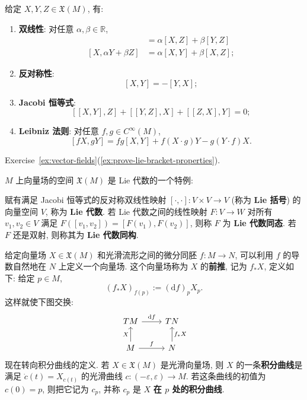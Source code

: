 \begin{RiemannProposition}\label{prop:identities-for-lie-bracket}
给定 $X,Y,Z\in\mathfrak{X}(M)$, 有:
\begin{enumerate}[label=(\roman*),leftmargin=*]
\item \textbf{双线性}: 对任意 $\alpha,\beta\in\mathbb{R}$,
\begin{align*}
  [\alpha X+\beta Y,Z]&=\alpha[X,Z]+\beta[Y,Z]\\
  [X,\alpha Y+\beta Z]&=\alpha[X,Y]+\beta[X,Z];
\end{align*}
\item \textbf{反对称性}:
\[
  [X,Y]=-[Y,X];
\]
\item \textbf{Jacobi 恒等式}:
\[
  [[X,Y],Z]+[[Y,Z],X]+[[Z,X],Y]=0;
\]
\item \textbf{Leibniz 法则}: 对任意 $f,g\in C^\infty(M)$,
\[
  [fX,gY]=fg[X,Y]+f(X\cdot g)Y-g(Y\cdot f)X.
\]
\end{enumerate}
\end{RiemannProposition}

\begin{RiemannProof}
Exercise~\ref{ex:vector-fields}(\ref{ex:prove-lie-bracket-properties}).
\end{RiemannProof}

$M$ 上向量场的空间 $\mathfrak{X}(M)$ 是 Lie 代数的一个特例:

\begin{RiemannDefinition}\label{def:lie-algebra}
赋有满足 Jacobi 恒等式的反对称双线性映射 $[\cdot,\cdot]:V\times V\to V$ (称为 \textbf{Lie 括号}) 的向量空间 $V$, 称为 \textbf{Lie 代数}. 若 Lie 代数之间的线性映射 $F:V\to W$ 对所有 $v_1,v_2\in V$ 满足 $F([v_1,v_2])=[F(v_1),F(v_2)]$, 则称 $F$ 为 \textbf{Lie 代数同态}. 若 $F$ 还是双射, 则称其为 \textbf{Lie 代数同构}.
\end{RiemannDefinition}

给定向量场 $X\in\mathfrak{X}(M)$ 和光滑流形之间的微分同胚 $f:M\to N$, 可以利用 $f$ 的导数自然地在 $N$ 上定义一个向量场. 这个向量场称为 $X$ 的\textbf{前推}, 记为 $f_*X$, 定义如下: 给定 $p\in M$,
\[
  (f_*X)_{f(p)}:=(\mathrm{d}f)_pX_p.
\]
这样就使下图交换:
\[
  \begin{tikzcd}[ampersand replacement=\&]
    TM\arrow[r,"\mathrm{d}f"]\&TN\\
    M\arrow[u,"X"]\arrow[r,"f"]\&N\arrow[u,"f_*X"']
  \end{tikzcd}
\]
现在转向积分曲线的定义. 若 $X\in\mathfrak{X}(M)$ 是光滑向量场, 则 $X$ 的一条\textbf{积分曲线}是满足 $\dot c(t)=X_{c(t)}$ 的光滑曲线 $c:(-\varepsilon,\varepsilon)\to M$. 若这条曲线的初值为 $c(0)=p$, 则把它记为 $c_p$, 并称 $c_p$ 是 $X$ \textbf{在 $p$ 处的积分曲线}.

